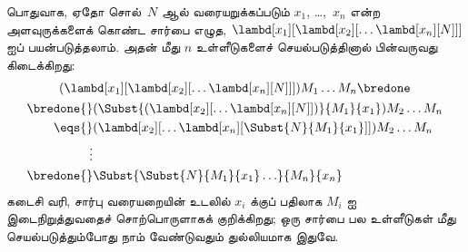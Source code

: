 \documentclass[../../../include/open-logic-section]{subfiles}
\begin{document}
பொதுவாக, ஏதோ சொல்~$N$ ஆல் வரையறுக்கப்படும் $x_1$, \dots,~$x_n$ என்ற
அளவுருக்களைக் கொண்ட சார்பை எழுத,
$\lambd[x_1][\lambd[x_2][\ldots\lambd[x_n][N]]]$ ஐப் பயன்படுத்தலாம். அதன்
மீது $n$ உள்ளீடுகளைச் செயல்படுத்தினால் பின்வருவது கிடைக்கிறது:
\begin{multline*}
  (\lambd[x_1][\lambd[x_2][\ldots\lambd[x_n][N]]]) M_1 \dots M_n \bredone\\
  \begin{aligned}
  \bredone {} & (\Subst{(\lambd[x_2][\ldots\lambd[x_n][N]])}{M_1}{x_1}) M_2
  \dots M_n\\
   \eqs {} & (\lambd[x_2][\ldots\lambd[x_n][\Subst{N}{M_1}{x_1}]]) M_2
            \dots M_n \\
  \vdots & \\
  \bredone {} &\Subst{\Subst{N}{M_1}{x_1}\ldots}{M_n}{x_n}
  \end{aligned}
\end{multline*}
கடைசி வரி, சார்பு வரையறையின் உடலில் $x_i$ க்குப் பதிலாக $M_i$ ஐ
இடைநிறுத்துவதைச் சொற்பொருளாகக் குறிக்கிறது; ஒரு சார்பை பல உள்ளீடுகள் மீது
செயல்படுத்தும்போது நாம் வேண்டுவதும் துல்லியமாக இதுவே.
\end{document}
